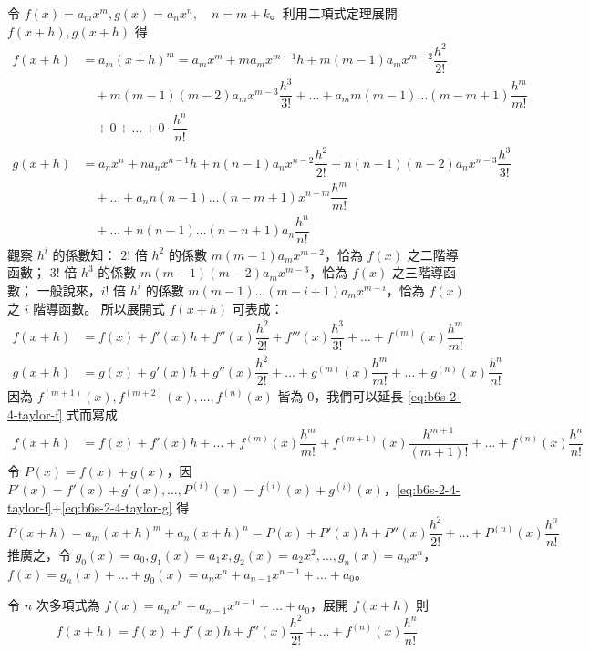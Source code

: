 令 $f(x)=a_m x^m, g(x)=a_n x^n, \quad n=m+k$。利用二項式定理展開 $f(x+h), g(x+h)$ 得
\begin{align*}
f(x+h) &= a_m(x+h)^m = a_m x^m + m a_m x^{m-1}h + m(m-1)a_m x^{m-2}\dfrac{h^2}{2!} \\
&\quad + m(m-1)(m-2)a_m x^{m-3}\dfrac{h^3}{3!} + \dots + a_m m(m-1)\dots(m-m+1)\dfrac{h^m}{m!} \\
&\quad + 0 + \dots + 0 \cdot \dfrac{h^n}{n!} \\
g(x+h) &= a_n x^n + n a_n x^{n-1}h + n(n-1)a_n x^{n-2}\dfrac{h^2}{2!} + n(n-1)(n-2)a_n x^{n-3}\dfrac{h^3}{3!} \\
&\quad + \dots + a_n n(n-1)\dots(n-m+1)x^{n-m}\dfrac{h^m}{m!} \\
&\quad + \dots + n(n-1)\dots(n-n+1)a_n \dfrac{h^n}{n!}
\end{align*}
觀察 $h^i$ 的係數知：
$2!$ 倍 $h^2$ 的係數 $m(m-1)a_m x^{m-2}$，恰為 $f(x)$ 之二階導函數；
$3!$ 倍 $h^3$ 的係數 $m(m-1)(m-2)a_m x^{m-3}$，恰為 $f(x)$ 之三階導函數；
一般說來，$i!$ 倍 $h^i$ 的係數 $m(m-1)\dots(m-i+1)a_m x^{m-i}$，恰為 $f(x)$ 之 $i$ 階導函數。
所以展開式 $f(x+h)$ 可表成：
\begin{align}
f(x+h) &= f(x) + f'(x)h + f''(x)\dfrac{h^2}{2!} + f'''(x)\dfrac{h^3}{3!} + \dots + f^{(m)}(x)\dfrac{h^m}{m!} \label{eq:b6s-2-4-taylor-f} \\
g(x+h) &= g(x) + g'(x)h + g''(x)\dfrac{h^2}{2!} + \dots + g^{(m)}(x)\dfrac{h^m}{m!} + \dots + g^{(n)}(x)\dfrac{h^n}{n!} \label{eq:b6s-2-4-taylor-g}
\end{align}
因為 $f^{(m+1)}(x), f^{(m+2)}(x), \dots, f^{(n)}(x)$ 皆為 0，我們可以延長 \eqref{eq:b6s-2-4-taylor-f} 式而寫成
\begin{align}
f(x+h) &= f(x) + f'(x)h + \dots + f^{(m)}(x)\dfrac{h^m}{m!} + f^{(m+1)}(x)\dfrac{h^{m+1}}{(m+1)!} + \dots + f^{(n)}(x)\dfrac{h^n}{n!} \label{eq:b6s-2-4-taylor-fp}
\end{align}
令 $P(x)=f(x)+g(x)$，因 $P'(x)=f'(x)+g'(x), \dots, P^{(i)}(x)=f^{(i)}(x)+g^{(i)}(x)$，\eqref{eq:b6s-2-4-taylor-f}+\eqref{eq:b6s-2-4-taylor-g} 得
\[ P(x+h) = a_m(x+h)^m + a_n(x+h)^n = P(x) + P'(x)h + P''(x)\dfrac{h^2}{2!} + \dots + P^{(n)}(x)\dfrac{h^n}{n!} \]
推廣之，令 $g_0(x)=a_0, g_1(x)=a_1 x, g_2(x)=a_2 x^2, \dots, g_n(x)=a_n x^n$，
$f(x) = g_n(x) + \dots + g_0(x) = a_n x^n + a_{n-1} x^{n-1} + \dots + a_0$。

\begin{theorem}\label{thm:b6s-2-taylor}
令 $n$ 次多項式為 $f(x)=a_n x^n + a_{n-1} x^{n-1} + \dots + a_0$，展開 $f(x+h)$ 則
\begin{equation}
f(x+h) = f(x) + f'(x)h + f''(x)\dfrac{h^2}{2!} + \dots + f^{(n)}(x)\dfrac{h^n}{n!} \tag{I} \label{eq:b6s-2-4-taylor-I}
\end{equation}
\end{theorem}

